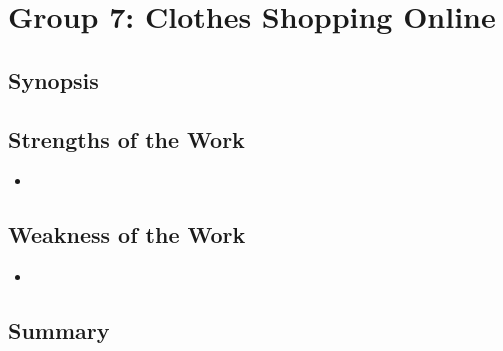 \section{Group 7: Clothes Shopping Online}

\subsection{Synopsis}

\subsection{Strengths of the Work}

\begin{itemize}
	\item
\end{itemize}

\subsection{Weakness of the Work}

\begin{itemize}
	\item
\end{itemize}

\subsection{Summary}
